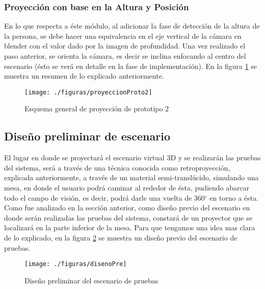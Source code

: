 \documentclass[a4paper,openright,12pt]{report}
\begin{document}
\subsubsection{Proyección con base en la Altura y Posición}
En lo que respecta a éste módulo, al adicionar la fase de detección de la altura de la persona, se debe hacer una equivalencia en el eje vertical de la cámara en blender con el valor dado por la imagen de profundidad. Una vez realizado el paso anterior, se orienta la cámara, es decir se inclina enfocando al centro del escenario (ésto se verá en detalle en la fase de implementación). En la figura \ref{fig:proyeccionProto2} se muestra un resumen de lo explicado anteriormente.
\begin{figure}[th]
	\centering
	\texttt{[image: ./figuras/proyeccionProto2]}
	\caption{Esquema general de proyección de prototipo 2} \label{fig:proyeccionProto2}
\end{figure}
\subsection{Diseño preliminar de escenario}
El lugar en donde se proyectará el escenario virtual 3D y se realizarán las pruebas del sistema, será a través de una técnica conocida como retroproyección, explicada anteriormente, a través de un material semi-translúcido, simulando una mesa, en donde el usuario podrá caminar al rededor de ésta, pudiendo abarcar todo el campo de visión, es decir, podrá darle una vuelta de 360$^{\circ}$ en torno a ésta. Como fue analizado en la sección anterior, como diseño previo del escenario en donde serán realizadas las pruebas del sistema, constará de un proyector que se localizará en la parte inferior de la mesa. Para que tengamos una idea mas clara de lo explicado, en la figura \ref{fig:disenoPre}  se muestra un diseño previo del escenario de pruebas.
\begin{figure}[th]
	\centering
	\texttt{[image: ./figuras/disenoPre]}
	\caption{Diseño preliminar del escenario de pruebas} \label{fig:disenoPre}
\end{figure}
\end{document}
